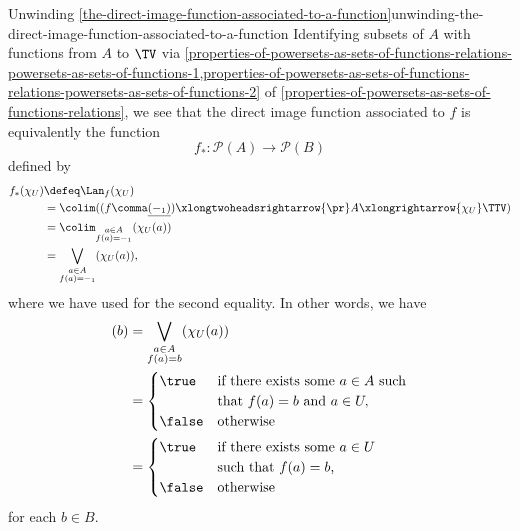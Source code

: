 \begin{remark}{Unwinding \cref{the-direct-image-function-associated-to-a-function}}{unwinding-the-direct-image-function-associated-to-a-function}%
    Identifying subsets of $A$ with functions from $A$ to $\TV$ via \cref{properties-of-powersets-as-sets-of-functions-relations-powersets-as-sets-of-functions-1,properties-of-powersets-as-sets-of-functions-relations-powersets-as-sets-of-functions-2} of \cref{properties-of-powersets-as-sets-of-functions-relations}, we see that the direct image function associated to $f$ is equivalently the function
    \[
        f_{*}%
        \colon%
        \mathcal{P}(A)%
        \to%
        \mathcal{P}(B)%
    \]%
    defined by
    \begin{align*}
        f_{*}(\chi_{U}) &\defeq \Lan_{f}(\chi_{U})\\%
                        &=      \colim((f\comma\underline{(-_{1})})\xlongtwoheadsrightarrow{\pr}A\xlongrightarrow{\chi_{U}}\TTV)\\%
                        &=      \colim_{\substack{a\in A\\f(a)=-_{1}}}(\chi_{U}(a))\\%
                        &=      \bigvee_{\substack{a\in A\\f(a)=-_{1}}}(\chi_{U}(a)),%
    \end{align*}
    where we have used  for the second equality. In other words, we have
    \begin{align*}
        [f_{*}(\chi_{U})](b)%
        &=%
        \bigvee_{\substack{a\in A\\f(a)=b}}(\chi_{U}(a))\\%
        &=%
        \begin{cases}
            \true  &\text{if there exists some $a\in A$ such}\\
                   &\text{that $f(a)=b$ and $a\in U,$}\\
            \false &\text{otherwise}
        \end{cases}\\
        &=%
        \begin{cases}
            \true  &\text{if there exists some $a\in U$}\\
                   &\text{such that $f(a)=b$,}\\
            \false &\text{otherwise}
        \end{cases}
    \end{align*}
    for each $b\in B$.
\end{remark}
